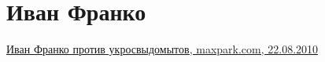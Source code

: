  
 
 
 
 
\section{Иван Франко}

\href{https://maxpark.com/user/vosokov/content/579055}{%
Иван Франко против укросвыдомытов, maxpark.com, 22.08.2010%
%
}
